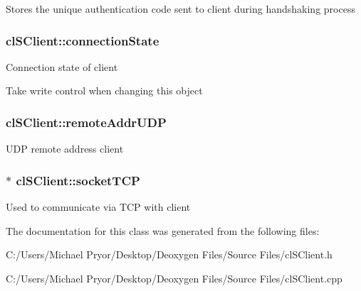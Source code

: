 Stores the unique authentication code sent to client during handshaking process \hypertarget{classcl_s_client_a1c0884f02facf322bc8fb8a1b78a3e5f}{
\subsubsection[{connectionState}]{ {\bf clSClient::connectionState}}}
\label{classcl_s_client_a1c0884f02facf322bc8fb8a1b78a3e5f}
Connection state of client \par
 Take write control when changing this object \hypertarget{classcl_s_client_a9caa557830e054fd916506b0b0b009ef}{
\subsubsection[{remoteAddrUDP}]{ {\bf clSClient::remoteAddrUDP}}}
\label{classcl_s_client_a9caa557830e054fd916506b0b0b009ef}
UDP remote address client \hypertarget{classcl_s_client_a7cc5ca2a86b8b3a96884ed174dffb0f3}{
\subsubsection[{socketTCP}]{$\ast$ {\bf clSClient::socketTCP}}}
\label{classcl_s_client_a7cc5ca2a86b8b3a96884ed174dffb0f3}
Used to communicate via TCP with client 

The documentation for this class was generated from the following files:\begin{DoxyCompactItemize}
\item 
C:/Users/Michael Pryor/Desktop/Deoxygen Files/Source Files/clSClient.h\item 
C:/Users/Michael Pryor/Desktop/Deoxygen Files/Source Files/clSClient.cpp\end{DoxyCompactItemize}
